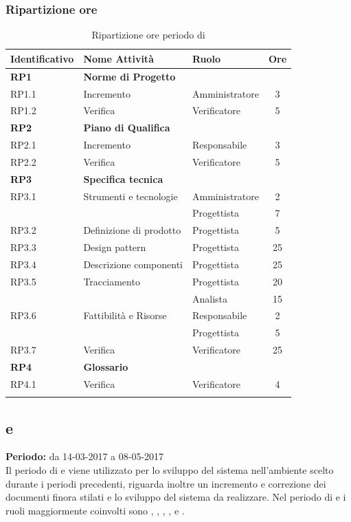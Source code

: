 \subsubsection{Ripartizione ore}
\bgroup
\begin{longtable}{|l|l|l|c|}
	\endfirsthead
	\hline
	\textbf{Identificativo} &
	\textbf{Nome Attività} &
	\textbf{Ruolo} &
	\textbf{Ore}\\
	\endhead
	\hline
	\textbf{RP1} & \textbf{Norme di Progetto} &  &  \\
	\hline
	{RP1.1} & {Incremento} & Amministratore  & 3\\
	\hline
	{RP1.2} & {Verifica} & Verificatore & 5 \\
	\hline
	\textbf{RP2} & \textbf{Piano di Qualifica}  & & \\
	\hline
	{RP2.1} & {Incremento} & Responsabile &  3\\
	\hline
	{RP2.2} & {Verifica} & Verificatore & 5 \\
	\hline
	\textbf{RP3} & \textbf{Specifica tecnica} & &  \\
	\hline
	{RP3.1} & {Strumenti e tecnologie} & Amministratore  &  2\\
	& & Progettista & 7 \\
	\hline
	{RP3.2} & {Definizione di prodotto} & Progettista  &  5\\
	\hline
	{RP3.3} & {Design pattern} & Progettista  &  25\\
	\hline
	{RP3.4} & {Descrizione componenti} & Progettista  &  25\\
	\hline
	{RP3.5} & {Tracciamento} & Progettista  &  20\\
	& & Analista & 15 \\
	\hline
	{RP3.6} & {Fattibilità e Risorse} & Responsabile  &  2\\
	& & Progettista & 5 \\
	\hline
	{RP3.7} & {Verifica} & Verificatore  &  25\\
	\hline
	\textbf{RP4} & \textbf{Glossario} & &  \\
	\hline
	{RP4.1} & {Verifica} & Verificatore &  4 \\
	\hline

	\caption{Ripartizione ore periodo di \PA{}}
\end{longtable}
\egroup

\subsection{\PD{} e \Cod{}}
\textbf{Periodo:} da 14-03-2017 a 08-05-2017 \\
Il periodo di \PD{} e \Cod{} viene utilizzato per lo sviluppo del sistema nell'ambiente scelto durante i periodi precedenti, riguarda inoltre un incremento e correzione dei documenti finora stilati e lo sviluppo del sistema da realizzare.
Nel periodo di \PD{} e \Cod{} i ruoli maggiormente coinvolti sono \Programmatore{}, \Progettista{}, \Analista{}, \Responsabile{}, \Amministratore{} e \Verificatore{}.
